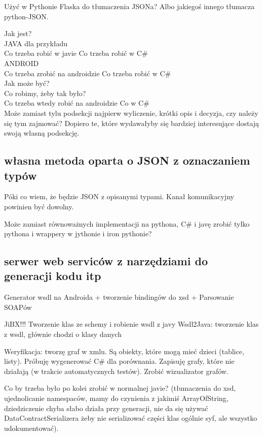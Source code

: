 Użyć w Pythonie Flaska do tłumaczenia JSONa? Albo jakiegoś innego tłumacza python-JSON.

Jak jest? \\
JAVA dla przykładu \\
Co trzeba robić w javie			Co trzeba robić w C\# \\
ANDROID \\
Co trzeba zrobić na androidzie		Co trzeba robić w C\# \\

Jak może być? \\
Co robimy, żeby tak było? \\
Co trzeba wtedy robić na androidzie	Co w C\# \\

Może zamiast tylu podsekcji najpierw wyliczenie, krótki opis i decyzja, czy należy się tym zajmować? Dopiero te, które wydawałyby się bardziej interesujące dostają swoją własną podsekcję.

\subsection{własna metoda oparta o JSON z oznaczaniem typów}
Póki co wiem, że będzie JSON z opisanymi typami. Kanał komunikacyjny powinien być dowolny. 

Może zamiast równoważnych implementacji na pythona, C\# i javę zrobić tylko pythona i wrappery w jythonie i iron pythonie?

\subsection{serwer web serviców z narzędziami do generacji kodu itp}
Generator wsdl na Androida + tworzenie bindingów do xsd + Parsowanie SOAPów

JiBX!!! Tworzenie klas ze schemy i robienie wsdl z javy
Wsdl2Java: tworzenie klas z wsdl, głównie chodzi o klasy danych

Weryfikacja: tworzę graf w xmlu. Są obiekty, które mogą mieć dzieci (tablice, listy). Próbuję wygenerować C\# dla porównania. Zapisuję grafy, które nie działają (w trakcie automatycznych testów). Zrobić wizualizator grafów.

Co by trzeba było po kolei zrobić w normalnej javie? (tłumaczenia do xsd, ujednolicanie namespaców, mamy do czynienia z jakimiś ArrayOfString, dziedziczenie chyba słabo działa przy generacji, nie da się używać DataContractSerializera żeby nie serializować części klas ogólnie syf, ale wszystko udokumentować). 

